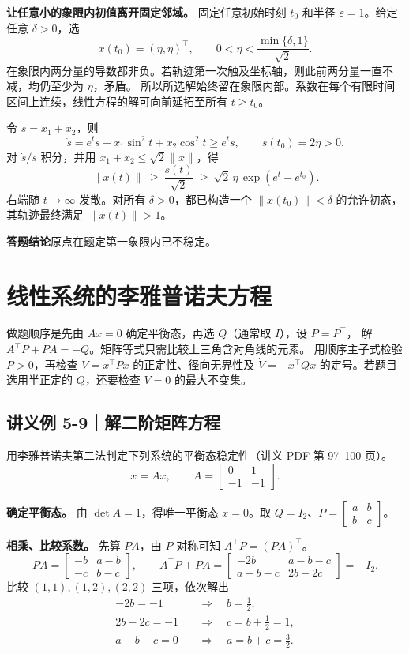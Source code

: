 \documentclass[UTF8,a4paper,11pt,fontset=fandol]{ctexart}
\begin{document}
\textbf{让任意小的象限内初值离开固定邻域。}
固定任意初始时刻 $t_0$ 和半径 $\varepsilon=1$。给定任意 $\delta>0$，选
\[
 x(t_0)=(\eta,\eta)^\top,\qquad
 0<\eta<\frac{\min\{\delta,1\}}{\sqrt2}.
\]
在象限内两分量的导数都非负。若轨迹第一次触及坐标轴，则此前两分量一直不减，均仍至少为 $\eta$，矛盾。
所以所选解始终留在象限内部。系数在每个有限时间区间上连续，线性方程的解可向前延拓至所有 $t\ge t_0$。

令 $s=x_1+x_2$，则
\[
 \dot s=e^t s+x_1\sin^2 t+x_2\cos^2 t\ge e^t s,
 \qquad s(t_0)=2\eta>0 .
\]
对 $\dot s/s$ 积分，并用 $x_1+x_2\le\sqrt2\lVert x\rVert$，得
\[
 \lVert x(t)\rVert
 \ \ge\ \frac{s(t)}{\sqrt2}
 \ \ge\ \sqrt2\,\eta\,\exp(e^t-e^{t_0}) .
\]
右端随 $t\to\infty$ 发散。对所有 $\delta>0$，都已构造一个 $\lVert x(t_0)\rVert<\delta$ 的允许初态，其轨迹最终满足 $\lVert x(t)\rVert>1$。

\textbf{答题结论}\quad 原点在题定第一象限内已不稳定。

\newpage
\section{线性系统的李雅普诺夫方程}\label{sec:linear}

\begin{keybox}
做题顺序是先由 $Ax=0$ 确定平衡态，再选 $Q$（通常取 $I$），设 $P=P^\top$，
解 $A^\top P+PA=-Q$。矩阵等式只需比较上三角含对角线的元素。
用顺序主子式检验 $P>0$，再检查 $V=x^\top Px$ 的正定性、径向无界性及
$\dot V=-x^\top Qx$ 的定号。若题目选用半正定的 $Q$，还要检查 $\dot V=0$ 的最大不变集。
\end{keybox}

\subsection*{讲义例 5-9｜解二阶矩阵方程}
用李雅普诺夫第二法判定下列系统的平衡态稳定性（讲义 PDF 第 97--100 页）。
\[
   \dot x=Ax,\qquad A=\begin{bmatrix}0&1\\-1&-1\end{bmatrix}.
\]

\textbf{确定平衡态。} 由 $\det A=1$，得唯一平衡态 $x=0$。取
$Q=I_2$、$P=\begin{bmatrix}a&b\\b&c\end{bmatrix}$。

\textbf{相乘、比较系数。} 先算 $PA$，由 $P$ 对称可知 $A^\top P=(PA)^\top$。
\[
   PA=\begin{bmatrix}-b&a-b\\-c&b-c\end{bmatrix},\qquad
   A^\top P+PA
   =\begin{bmatrix}-2b&a-b-c\\a-b-c&2b-2c\end{bmatrix}=-I_2 .
\]
比较 $(1,1),(1,2),(2,2)$ 三项，依次解出
\[
 \begin{aligned}
   -2b=-1          &\quad\Longrightarrow\quad b=\tfrac12,\\
   2b-2c=-1        &\quad\Longrightarrow\quad c=b+\tfrac12=1,\\
   a-b-c=0         &\quad\Longrightarrow\quad a=b+c=\tfrac32 .
 \end{aligned}
\]
\end{document}
